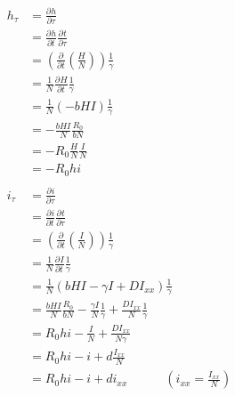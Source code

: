 \documentclass[plain]{pset}
\newcommand{\p}{\partial}
\newcommand{\pdv}[3][]{\frac{\p^{#1} #2}{\p #3^{#1}}}
\begin{document}
\begin{solution}
    \begin{align*}
        h_\tau & = \pdv{h}{\tau}                                                                                        \\
               & = \pdv{h}{t}\pdv{t}{\tau}                                                                              \\
               & = \left(\pdv{}{t}\left(\frac{H}{N}\right)\right)\frac{1}{\gamma}                                       \\
               & = \frac{1}{N}\pdv{H}{t}\frac{1}{\gamma}                                                                \\
               & = \frac{1}{N}\left(-bHI\right)\frac{1}{\gamma}                                                         \\
               & = -\frac{bHI}{N}\frac{R_0}{bN}                                                                         \\
               & = -R_0 \frac{H}{N}\frac{I}{N}                                                                          \\
               & = -R_0 hi                                                                                              \\
               &                                                                                                        \\
        i_\tau & = \pdv{i}{\tau}                                                                                        \\
               & = \pdv{i}{t}\pdv{t}{\tau}                                                                              \\
               & = \left(\pdv{}{t}\left(\frac{I}{N}\right)\right)\frac{1}{\gamma}                                       \\
               & = \frac{1}{N}\pdv{I}{t}\frac{1}{\gamma}                                                                \\
               & = \frac{1}{N}\left(bHI - \gamma I + DI_{xx}\right)\frac{1}{\gamma}                                     \\
               & = \frac{bHI}{N}\frac{R_0}{bN} - \frac{\gamma I}{N}\frac{1}{\gamma} + \frac{DI_{xx}}{N}\frac{1}{\gamma} \\
               & = R_0 hi - \frac{I}{N} + \frac{DI_{xx}}{N\gamma}                                                       \\
               & = R_0 hi - i + d\frac{I_{xx}}{N}                                                                       \\
               & = R_0 hi - i + di_{xx} \quad \qquad \left(i_{xx} = \frac{I_{xx}}{N}\right)
    \end{align*}
\end{solution}
\end{document}
